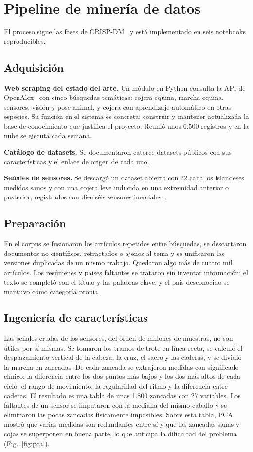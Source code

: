 \documentclass[conference,a4paper]{IEEEtran}
\begin{document}
\section{Pipeline de minería de datos}
El proceso sigue las fases de CRISP-DM~\cite{wirth2000} y está implementado en seis notebooks reproducibles.

\subsection{Adquisición}
\textbf{Web scraping del estado del arte.} Un módulo en Python consulta la API de OpenAlex~\cite{priem2022openalex} con cinco búsquedas temáticas: cojera equina, marcha equina, sensores, visión y pose animal, y cojera con aprendizaje automático en otras especies. Su función en el sistema es concreta: construir y mantener actualizada la base de conocimiento que justifica el proyecto. Reunió unos 6.500 registros y en la nube se ejecuta cada semana.

\textbf{Catálogo de datasets.} Se documentaron catorce datasets públicos con sus características y el enlace de origen de cada uno.

\textbf{Señales de sensores.} Se descargó un dataset abierto con 22 caballos islandeses medidos sanos y con una cojera leve inducida en una extremidad anterior o posterior, registrados con dieciséis sensores inerciales~\cite{smit2023dataset}.

\subsection{Preparación}
En el corpus se fusionaron los artículos repetidos entre búsquedas, se descartaron documentos no científicos, retractados o ajenos al tema y se unificaron las versiones duplicadas de un mismo trabajo. Quedaron algo más de cuatro mil artículos. Los resúmenes y países faltantes se trataron sin inventar información: el texto se completó con el título y las palabras clave, y el país desconocido se mantuvo como categoría propia.

\subsection{Ingeniería de características}
Las señales crudas de los sensores, del orden de millones de muestras, no son útiles por sí mismas. Se tomaron los tramos de trote en línea recta, se calculó el desplazamiento vertical de la cabeza, la cruz, el sacro y las caderas, y se dividió la marcha en zancadas. De cada zancada se extrajeron medidas con significado clínico: la diferencia entre los dos puntos más bajos y los dos más altos de cada ciclo, el rango de movimiento, la regularidad del ritmo y la diferencia entre caderas. El resultado es una tabla de unas 1.800 zancadas con 27 variables. Los faltantes de un sensor se imputaron con la mediana del mismo caballo y se eliminaron las pocas zancadas físicamente imposibles. Sobre esta tabla, PCA mostró que varias medidas son redundantes entre sí y que las zancadas sanas y cojas se superponen en buena parte, lo que anticipa la dificultad del problema (Fig.~\ref{fig:pca}).
\end{document}
